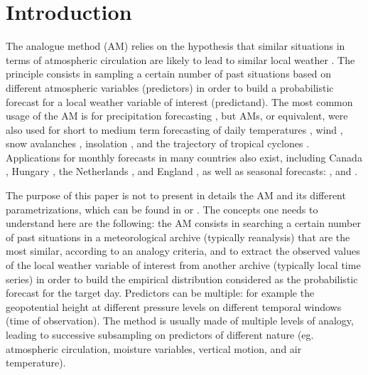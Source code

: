 \documentclass[twocol]{ametsoc}
\begin{document}


\section{Introduction}
\label{section_intro}

The analogue method (AM) relies on the hypothesis that similar situations in terms of atmospheric circulation are likely to lead to similar local weather \citep{Lorenz1956, Lorenz1969, Duband1970, Bontron2005}. The principle consists in sampling a certain number of past situations based on different atmospheric variables (predictors) in order to build a probabilistic forecast for a local weather variable of interest (predictand). The most common usage of the AM is for precipitation forecasting \citep[eg.][]{Guilbaud1997, Bontron2005, Bliefernicht2010, Marty2012, Horton2012, Radanovics2013, BenDaoud2015}, but AMs, or equivalent, were also used for short to medium term forecasting of daily temperatures \citep{Radinovic1975, Woodcock1980, Kruizinga1983}, wind \citep{Gordon1987}, snow avalanches \citep{Obled1980, Bolognesi1993}, insolation \citep{Bois1981}, and the trajectory of tropical cyclones \citep{Keenan1981, Sievers2000, Fraedrich2003}. Applications for monthly forecasts in many countries also exist, including Canada \citep{Shabbar1986},  Hungary \citep{Toth1989}, the Netherlands \citep{Nap1981}, and England \citep{Murray1974}, as well as seasonal forecasts: \citet{Barnett1978}, \citet{Bergen1982} and \citet{Livezey1988}.

The purpose of this paper is not to present in details the AM and its different parametrizations, which can be found in \citet{Horton2016} or \citet{BenDaoud2015}. The concepts one needs to understand here are the following: the AM consists in searching a certain number of past situations in a meteorological archive (typically reanalysis) that are the most similar, according to an analogy criteria, and to extract the observed values of the local weather variable of interest from another archive (typically local time series) in order to build the empirical distribution considered as the probabilistic forecast for the target day. Predictors can be multiple: for example the geopotential height at different pressure levels on different temporal windows (time of observation). The method is usually made of multiple levels of analogy, leading to successive subsampling on predictors of different nature (eg. atmospheric circulation, moisture variables, vertical motion, and air temperature).
\end{document}
